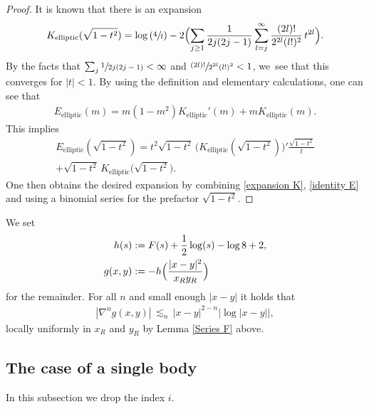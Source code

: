 \documentclass[10pt]{amsart}
\theoremstyle{definition}
\newcommand\eq{=}
\begin{document}
\begin{proof}
It is known \cite[p.\,53]{schwarz1893formeln} that there is an expansion
\begin{align}
K_\mathrm{elliptic}(\sqrt{1-t^2})\eq\log\left(\sfrac{4}{t}\right)-2\Bigl(\sum_{j\geq 1}\frac{1}{2j(2j-1)}\sum_{l=j}^\infty \frac{(2l)!}{2^{2l}(l!)^2}\,t^{2l}\Bigr).\label{expansion K}
\end{align}
By the facts that $\sum_j\sfrac{1}{2j(2j-1)}<\infty$ and $\sfrac{(2l)!}{2^{2l}(l!)^2}<1$, we~see that this converges for $|t|<1$.
By using the definition and elementary calculations, one can see that
\begin{align*}
E_\mathrm{elliptic}(m)\eq m(1-m^2)K_\mathrm{elliptic}'(m)+mK_\mathrm{elliptic}(m).
\end{align*}
This implies
\begin{multline}
E_\mathrm{elliptic}(\sqrt{1-t^2})\eq t^2\sqrt{1-t^2}\,\bigl(K_\mathrm{elliptic}(\sqrt{1-t^2})\bigr)'\frac{\sqrt{1-t^2}}{t}\\
+\sqrt{1-t^2}\,K_\mathrm{elliptic}\bigl(\sqrt{1-t^2}\bigr).\label{identity E}
\end{multline}
One then obtains the desired expansion by combining \eqref{expansion K}, \eqref{identity E} and using a binomial series for the prefactor $\sqrt{1-t^2}$.\end{proof}

We set
\begin{align*}
h(s)&:=F(s)+\frac{1}{2}\log(s)-\log 8+2,\\
g(x,y)&:=- h\Bigl(\frac{|x-y|^2}{x_Ry_R}\Bigr)
\end{align*}
for the remainder. For all $n$ and small enough $|x-y|$ it holds that
\begin{align}\label{est g}
|\nabla^ng(x,y)|\,\lesssim_n\, |x-y|^{2-n}\bigl|{\log|x-y|}\bigr|,
\end{align}
locally uniformly in $x_R$ and $y_R$ by Lemma \ref{Series F} above.

\subsection{The case of a single body}
In this subsection we drop the index $i$.
\end{document}
